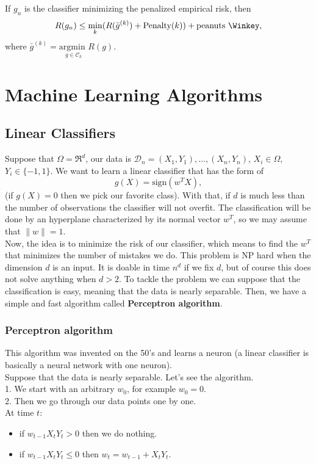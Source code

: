 \documentclass[11pt, english]{article}
\begin{document}
If $g_n$ is the classifier minimizing the penalized empirical risk, then
\begin{equation}
	R(g_n)\leq \underset{k}{\min}(R(\bar{g}^{(k)})+\text{Penalty}(k))+\text{peanuts \Winkey},%
\end{equation} 
where $\bar{g}^{(k)}=\underset{g\in\mathcal{C}_k}{\text{argmin }}R(g)$.

\section{Machine Learning Algorithms}

\subsection{Linear Classifiers} %

Suppose that $\Omega= \Re^d$, our data is $\mathcal{D}_n=(X_1,Y_1),\dots,(X_n,Y_n)$, $X_i\in \Omega$, $Y_i\in\{-1,1\}$. We want to learn a linear classifier that has the form of 
\begin{equation}
	g(X)=\text{sign}(w^TX),
\end{equation}
(if $g(X)=0$ then we pick our favorite class). With that, if $d$ is much less than the number of observations the classifier will not overfit. The classification will be done by an hyperplane characterized by its normal vector $w^T$, so we may assume that $\|w\|=1$.\\

Now, the idea is to minimize the risk of our classifier, which means to find the $w^T$ that minimizes the number of mistakes we do. This problem is NP hard when the dimension $d$ is an input. It is doable in time $n^d$ if we fix $d$, but of course this does not solve anything when $d>2$. To tackle the problem we can suppose that the classification is easy, meaning that the data is nearly separable. Then, we have a simple and fast algorithm called \textbf{Perceptron algorithm}.

\subsubsection{Perceptron algorithm}
This algorithm was invented on the 50's and learns a neuron (a linear classifier is basically a neural network with one neuron). \\
Suppose that the data is nearly separable. Let's see the algorithm.\\

1. We start with an arbitrary $w_0$, for example $w_0=0$.\\
2. Then we go through our data points one by one.\\
At time $t$:
\begin{itemize}
	\item[]  if $w_{t-1}X_tY_t> 0$ then we do nothing.
	\item[]  if $w_{t-1}X_tY_t\leq 0$ then $w_t=w_{t-1}+X_tY_t$.
\end{itemize}
\end{document}
